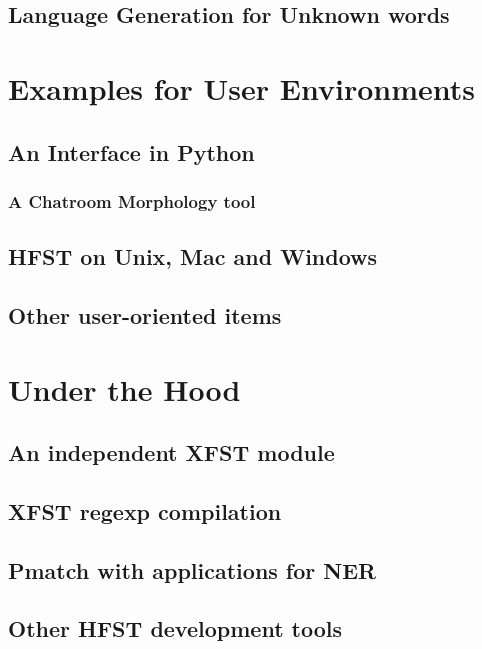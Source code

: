 \documentclass{llncs}
\begin{document}
\subsection{Language Generation for Unknown words}

\section{Examples for User Environments}

\subsection{An Interface in Python}

\subsubsection{A Chatroom Morphology tool}

\subsection{HFST on Unix, Mac and Windows}

\subsection{Other user-oriented items}

\section{Under the Hood}

\subsection{An independent XFST module}

\subsection{XFST regexp compilation}

\subsection{Pmatch with applications for NER}

\subsection{Other HFST development tools}
\end{document}
